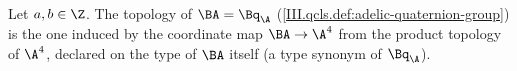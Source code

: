 Let $a,b\in\Z$. The topology of $\BA=\Bq_{\A}$ (\cref{III.qcls.def:adelic-quaternion-group}) is the one induced by the coordinate map $\BA\to\A^4$ from the product topology of
$\A^4$, declared on the type of $\BA$ itself (a type synonym of $\Bq_{\A}$).
